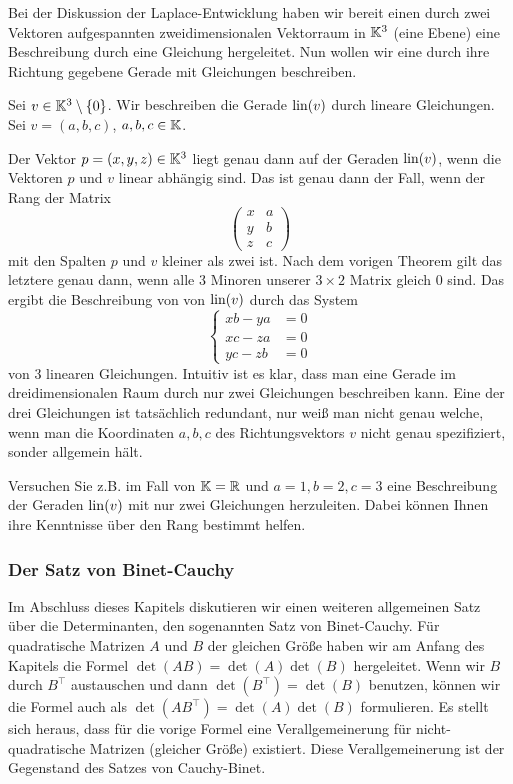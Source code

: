 \begin{bsp}
	Bei der Diskussion der Laplace-Entwicklung haben wir bereit einen durch zwei Vektoren aufgespannten zweidimensionalen Vektorraum in $\mathbb K^3$ (eine Ebene) eine Beschreibung durch eine Gleichung hergeleitet. Nun wollen wir eine durch ihre Richtung gegebene Gerade mit Gleichungen beschreiben. 
	
	Sei $ v \in \mathbb K^3 \setminus \{ 0 \} $. Wir beschreiben die Gerade $ \operatorname{lin}(v) $ durch lineare Gleichungen. Sei $ v = (a,b,c) $, $ a,b,c \in \mathbb K $.
	
	Der Vektor $ p = (x,y,z) \in \mathbb K^3 $ liegt genau dann auf der Geraden $\operatorname{lin}(v)$, wenn  die Vektoren $p$ und $v$ linear abhängig sind. Das ist genau dann der Fall, wenn der Rang der Matrix 
	\begin{equation*}
		\begin{pmatrix}
			x & a \\
			y & b \\
			z & c
		\end{pmatrix}
	\end{equation*}
	mit den Spalten $p$ und $v$ kleiner als zwei ist. Nach dem vorigen Theorem gilt das letztere genau dann, wenn alle $3$ Minoren unserer $3 \times 2$ Matrix gleich $0$ sind. 
	Das ergibt die Beschreibung von von $\operatorname{lin}(v)$ durch das System
	\[
		 \left\{ \begin{aligned}
		xb - ya &= 0 \\
		xc - za &= 0 \\
		yc - zb &= 0
	\end{aligned} \right. 
	\] 
	von $3$ linearen Gleichungen.  Intuitiv ist es klar, dass man eine Gerade im dreidimensionalen Raum durch nur zwei Gleichungen beschreiben kann. Eine der drei Gleichungen ist tatsächlich redundant, nur weiß man nicht genau welche, wenn man die Koordinaten $a,b,c$ des Richtungsvektors $v$ nicht genau spezifiziert, sonder allgemein hält. 
	
	Versuchen Sie z.B. im Fall von $\mathbb K=\mathbb R$ und $a=1, b=2, c=3$ eine Beschreibung der Geraden $\operatorname{lin}(v)$ mit nur zwei Gleichungen herzuleiten. Dabei können Ihnen ihre Kenntnisse über den Rang bestimmt helfen. 
\end{bsp}

\subsubsection{Der Satz von Binet-Cauchy}

Im Abschluss dieses Kapitels diskutieren wir einen weiteren allgemeinen Satz über die Determinanten, den sogenannten Satz von Binet-Cauchy. Für quadratische Matrizen $A$ und $B$ der gleichen Größe haben wir am Anfang des Kapitels die Formel $\det(A B) = \det(A) \det(B)$ hergeleitet. Wenn wir $B$ durch $B^\top$ austauschen und dann $\det(B^\top) = \det(B)$ benutzen, können wir die Formel auch als $\det(A B^\top) = \det(A) \det(B)$ formulieren. Es stellt sich heraus, dass für die vorige Formel eine Verallgemeinerung für nicht-quadratische Matrizen (gleicher Größe) existiert. Diese Verallgemeinerung ist der Gegenstand des Satzes von Cauchy-Binet. 

